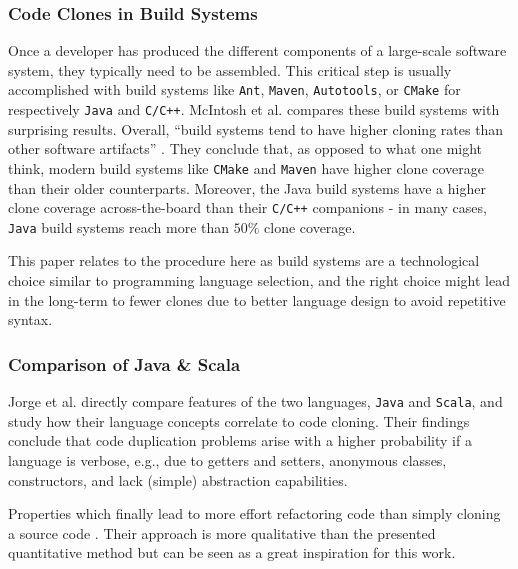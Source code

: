 \subsubsection{Code Clones in Build Systems}

Once a developer has produced the different components of a large-scale software system, they typically need to be assembled. This critical step is usually accomplished with build systems like \texttt{Ant},  \texttt{Maven}, \texttt{Autotools}, or \texttt{CMake} for respectively \texttt{Java} and \texttt{C/C++}. McIntosh et al. \cite{mcintosh2014collecting} compares these build systems with surprising results. Overall, ``build systems tend to have higher cloning rates than other software artifacts'' \cite{mcintosh2014collecting}. They conclude that, as opposed to what one might think, modern build systems like \texttt{CMake} and  \texttt{Maven} have higher clone coverage than their older counterparts. Moreover, the Java build systems have a higher clone coverage across-the-board than their \texttt{C/C++} companions - in many cases, \texttt{Java} build systems reach more than $50\%$ clone coverage.

This paper relates to the procedure here as build systems are a technological choice similar to programming language selection, and the right choice might lead in the long-term to fewer clones due to better language design to avoid repetitive syntax.

\subsubsection{Comparison of Java \& Scala}

Jorge et al. \cite{jorge2012impact} directly compare features of the two languages, \texttt{Java} and \texttt{Scala}, and study how their language concepts correlate to code cloning. Their findings conclude that code duplication problems arise with a higher probability if a language is verbose, e.g., due to getters and setters, anonymous classes, constructors, and lack (simple) abstraction capabilities. 

Properties which finally lead to more effort refactoring code than simply cloning a source code \cite{jorge2012impact}.
Their approach is more qualitative than the presented quantitative method but can be seen as a great inspiration for this work.
